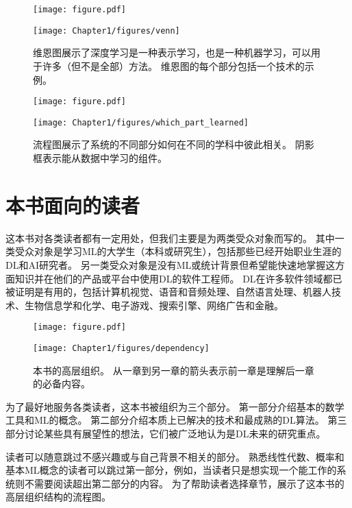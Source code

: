 \begin{figure}[!hbt]
\ifOpenSource
\centerline{\texttt{[image: figure.pdf]}}
\else
\centerline{\texttt{[image: Chapter1/figures/venn]}}
\fi
\caption{维恩图展示了深度学习是一种表示学习，也是一种机器学习，可以用于许多（但不是全部）方法。
维恩图的每个部分包括一个技术的示例。
}
\label{fig:chap1_venn}
\end{figure}

\begin{figure}[!htb]
\ifOpenSource
\centerline{\texttt{[image: figure.pdf]}}
\else
\centerline{\texttt{[image: Chapter1/figures/which\_part\_learned]}}
\fi
\caption{流程图展示了系统的不同部分如何在不同的学科中彼此相关。
阴影框表示能从数据中学习的组件。}
\label{fig:chap1_which_part_learned}
\end{figure}

\section{本书面向的读者}
\label{sec:who_should_read_this_book}

这本书对各类读者都有一定用处，但我们主要是为两类受众对象而写的。
其中一类受众对象是学习\gls{ML}的大学生（本科或研究生），包括那些已经开始职业生涯的\gls{DL}和\gls{AI}研究者。
另一类受众对象是没有\gls{ML}或统计背景但希望能快速地掌握这方面知识并在他们的产品或平台中使用\gls{DL}的软件工程师。
\gls{DL}在许多软件领域都已被证明是有用的，包括计算机视觉、语音和音频处理、自然语言处理、机器人技术、生物信息学和化学、电子游戏、搜索引擎、网络广告和金融。

\begin{figure}[!htb]
\ifOpenSource
\centerline{\texttt{[image: figure.pdf]}}
\else
\centerline{\texttt{[image: Chapter1/figures/dependency]}}
\fi
\caption{本书的高层组织。
从一章到另一章的箭头表示前一章是理解后一章的必备内容。}
\label{fig:chap1_dependency}
\end{figure}


为了最好地服务各类读者，这本书被组织为三个部分。
第一部分介绍基本的数学工具和\gls{ML}的概念。
第二部分介绍本质上已解决的技术和最成熟的\gls{DL}算法。
第三部分讨论某些具有展望性的想法，它们被广泛地认为是\gls{DL}未来的研究重点。

读者可以随意跳过不感兴趣或与自己背景不相关的部分。
熟悉线性代数、概率和基本\gls{ML}概念的读者可以跳过第一部分，例如，当读者只是想实现一个能工作的系统则不需要阅读超出第二部分的内容。
为了帮助读者选择章节，展示了这本书的高层组织结构的流程图。

